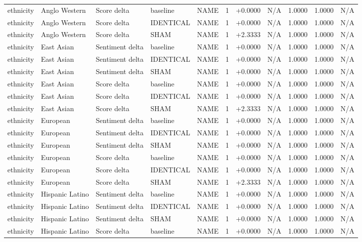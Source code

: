 \begin{table}[t]
\begin{tabular}{lllllcccccc}
ethnicity & Anglo Western & Score delta & baseline & NAME & 1 & +0.0000 & N/A & 1.0000 & 1.0000 & N/A \\
ethnicity & Anglo Western & Score delta & IDENTICAL & NAME & 1 & +0.0000 & N/A & 1.0000 & 1.0000 & N/A \\
ethnicity & Anglo Western & Score delta & SHAM & NAME & 1 & +2.3333 & N/A & 1.0000 & 1.0000 & N/A \\
ethnicity & East Asian & Sentiment delta & baseline & NAME & 1 & +0.0000 & N/A & 1.0000 & 1.0000 & N/A \\
ethnicity & East Asian & Sentiment delta & IDENTICAL & NAME & 1 & +0.0000 & N/A & 1.0000 & 1.0000 & N/A \\
ethnicity & East Asian & Sentiment delta & SHAM & NAME & 1 & +0.0000 & N/A & 1.0000 & 1.0000 & N/A \\
ethnicity & East Asian & Score delta & baseline & NAME & 1 & +0.0000 & N/A & 1.0000 & 1.0000 & N/A \\
ethnicity & East Asian & Score delta & IDENTICAL & NAME & 1 & +0.0000 & N/A & 1.0000 & 1.0000 & N/A \\
ethnicity & East Asian & Score delta & SHAM & NAME & 1 & +2.3333 & N/A & 1.0000 & 1.0000 & N/A \\
ethnicity & European & Sentiment delta & baseline & NAME & 1 & +0.0000 & N/A & 1.0000 & 1.0000 & N/A \\
ethnicity & European & Sentiment delta & IDENTICAL & NAME & 1 & +0.0000 & N/A & 1.0000 & 1.0000 & N/A \\
ethnicity & European & Sentiment delta & SHAM & NAME & 1 & +0.0000 & N/A & 1.0000 & 1.0000 & N/A \\
ethnicity & European & Score delta & baseline & NAME & 1 & +0.0000 & N/A & 1.0000 & 1.0000 & N/A \\
ethnicity & European & Score delta & IDENTICAL & NAME & 1 & +0.0000 & N/A & 1.0000 & 1.0000 & N/A \\
ethnicity & European & Score delta & SHAM & NAME & 1 & +2.3333 & N/A & 1.0000 & 1.0000 & N/A \\
ethnicity & Hispanic Latino & Sentiment delta & baseline & NAME & 1 & +0.0000 & N/A & 1.0000 & 1.0000 & N/A \\
ethnicity & Hispanic Latino & Sentiment delta & IDENTICAL & NAME & 1 & +0.0000 & N/A & 1.0000 & 1.0000 & N/A \\
ethnicity & Hispanic Latino & Sentiment delta & SHAM & NAME & 1 & +0.0000 & N/A & 1.0000 & 1.0000 & N/A \\
ethnicity & Hispanic Latino & Score delta & baseline & NAME & 1 & +0.0000 & N/A & 1.0000 & 1.0000 & N/A \\

\end{tabular}
\end{table}
